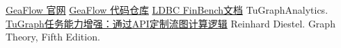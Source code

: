 \begin{thebibliography}{99}
 \href{https://tugraph-analytics.readthedocs.io/en/latest/}{GeaFlow 官网}
 \href{https://github.com/TuGraph-family/tugraph-analytics}{GeaFlow 代码仓库}
 \href{https://arxiv.org/pdf/2306.15975.pdf}{LDBC FinBench⽂档}
 TuGraphAnalytics. \href{https://zhuanlan.zhihu.com/p/650101776}{TuGraph任务能⼒增强：通过API定制流图计算逻辑}
 Reinhard Diestel. Graph Theory, Fifth Edition.
\end{thebibliography}
